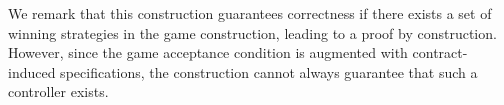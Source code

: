 We remark that this construction guarantees correctness if there exists a set of winning strategies in the game construction, leading to a proof by construction. However, since the game acceptance condition is augmented with contract-induced specifications, the construction cannot always guarantee that such a controller exists. 


